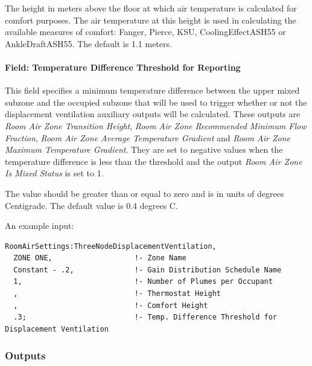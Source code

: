 The height in meters above the floor at which air temperature is calculated for comfort purposes. The air temperature at this height is used in calculating the available measures of comfort: Fanger, Pierce, KSU, CoolingEffectASH55 or AnkleDraftASH55. The default is 1.1 meters.

\paragraph{Field: Temperature Difference Threshold for Reporting}\label{field-temperature-difference-threshold-for-reporting}

This field specifies a minimum temperature difference between the upper mixed subzone and the occupied subzone that will be used to trigger whether or not the displacement ventilation auxiliary outputs will be calculated. These outputs are \emph{Room Air Zone Transition Height}, \emph{Room Air Zone Recommended Minimum Flow Fraction}, \emph{Room Air Zone Average Temperature Gradient} and \emph{Room Air Zone Maximum Temperature Gradient}. They are set to negative values when the temperature difference is less than the threshold and the output \emph{Room Air Zone Is Mixed Status} is set to 1.

The value should be greater than or equal to zero and is in units of degrees Centigrade. The default value is 0.4 degrees C.

An example input:

\begin{lstlisting}
RoomAirSettings:ThreeNodeDisplacementVentilation,
  ZONE ONE,                   !- Zone Name
  Constant - .2,              !- Gain Distribution Schedule Name
  1,                          !- Number of Plumes per Occupant
  ,                           !- Thermostat Height
  ,                           !- Comfort Height
  .3;                         !- Temp. Difference Threshold for Displacement Ventilation
\end{lstlisting}

\subsubsection{Outputs}\label{roomairsettingsthreenodedisplacementventilation-outputs}

